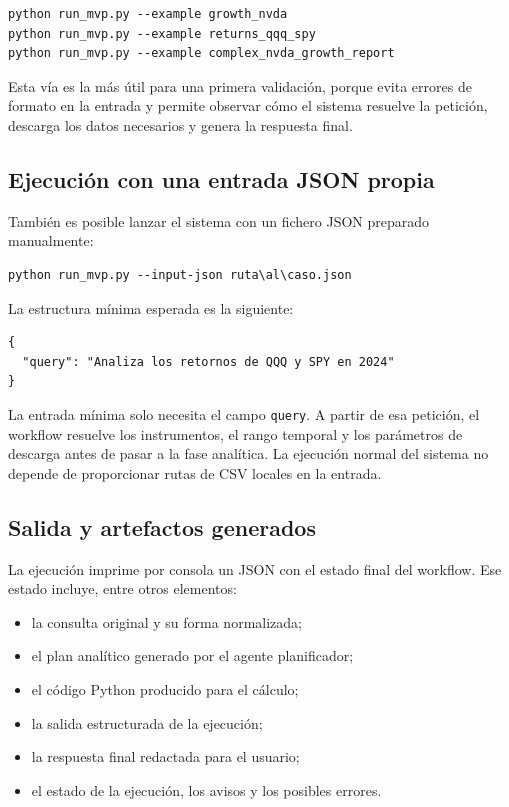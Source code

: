 \begin{verbatim}
python run_mvp.py --example growth_nvda
python run_mvp.py --example returns_qqq_spy
python run_mvp.py --example complex_nvda_growth_report
\end{verbatim}

Esta v\'ia es la m\'as \'util para una primera validaci\'on, porque evita errores de formato en la entrada y permite observar c\'omo el sistema resuelve la petici\'on, descarga los datos necesarios y genera la respuesta final.

\subsection{Ejecuci\'on con una entrada JSON propia}

Tambi\'en es posible lanzar el sistema con un fichero JSON preparado manualmente:

\begin{verbatim}
python run_mvp.py --input-json ruta\al\caso.json
\end{verbatim}

La estructura m\'inima esperada es la siguiente:

\begin{footnotesize}
\begin{verbatim}
{
  "query": "Analiza los retornos de QQQ y SPY en 2024"
}
\end{verbatim}
\end{footnotesize}

La entrada m\'inima solo necesita el campo \texttt{query}. A partir de esa petici\'on, el workflow resuelve los instrumentos, el rango temporal y los par\'ametros de descarga antes de pasar a la fase anal\'itica. La ejecuci\'on normal del sistema no depende de proporcionar rutas de CSV locales en la entrada.

\subsection{Salida y artefactos generados}

La ejecuci\'on imprime por consola un JSON con el estado final del workflow. Ese estado incluye, entre otros elementos:

\begin{itemize}
    \item la consulta original y su forma normalizada;
    \item el plan anal\'itico generado por el agente planificador;
    \item el c\'odigo Python producido para el c\'alculo;
    \item la salida estructurada de la ejecuci\'on;
    \item la respuesta final redactada para el usuario;
    \item el estado de la ejecuci\'on, los avisos y los posibles errores.
\end{itemize}

